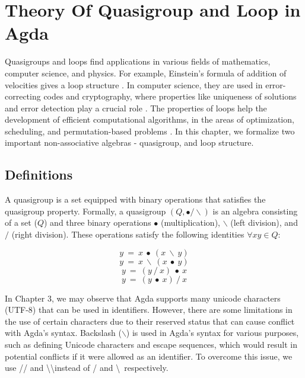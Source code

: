 \chapter{Theory Of Quasigroup and Loop in Agda}
Quasigroups and loops find applications in various fields of mathematics,
computer science, and physics. For example, Einstein's formula of addition of
velocities gives a loop structure \cite{ungar2007einstein}. In computer science,
they are used in error-correcting codes and cryptography, where properties like
uniqueness of solutions and error detection play a crucial role
\cite{phillips2010automated}. The properties of loops help the development of
efficient computational algorithms, in the areas of optimization, scheduling,
and permutation-based problems \cite{khan2015mining}. In this chapter, we
formalize two important non-associative algebras - quasigroup, and loop
structure.
 
\section{Definitions}
A quasigroup is a set equipped with binary operations that satisfies the
quasigroup property. Formally, a quasigroup $(Q,∙/\backslash)$ is an algebra
consisting of a set ($Q$) and three binary operations $∙$ (multiplication),
$\backslash$ (left division), and $/$ (right division). These operations satisfy
the following identities $\forall x y \in Q$:

\begin{equation} \label{eq_L-leftdivides}
y\ =\ x\ ∙\ (x\ \backslash\ y)
\end{equation}
\begin{equation} \label{eq_L-rightdivides}
y\ =\ x\ \backslash\ (x\ ∙\ y)
\end{equation}
\begin{equation} \label{eq_R-leftdivides}
y\ =\ (y\ /\ x)\ ∙\ x
\end{equation}
\begin{equation} \label{eq_Rirightdivides}
y\ =\ (y\ ∙\ x)\ /\ x
\end{equation}

In Chapter 3, we may observe that Agda supports many unicode characters (UTF-8)
that can be used in identifiers. However, there are some limitations in the use
of certain characters due to their reserved status that can cause conflict with
Agda's syntax. Backslash ($\backslash$) is used in Agda's syntax for various
purposes, such as defining Unicode characters and escape sequences, which would
result in potential conflicts if it were allowed as an identifier. To overcome
this issue, we use // and \textbackslash\textbackslash instead of / and
\textbackslash \ respectively.

